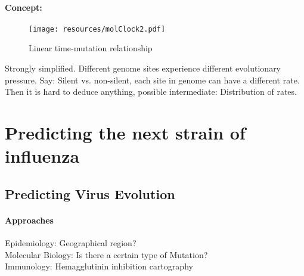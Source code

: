 \documentclass{beamer}
\begin{document}
\begin{darkframes}
    \begin{frame}{\secname}
      \framesubtitle{Concept: \subsecname}
      \begin{figure}
        \texttt{[image: resources/molClock2.pdf]}
        \caption{\footnotesize Linear time-mutation relationship}
      \end{figure}
      \vspace*{-.2cm}
      \footnotesize
      Strongly simplified. Different genome sites experience different evolutionary pressure. Say: Silent vs. non-silent, each site in genome can have a different rate. Then it is hard to deduce anything, possible intermediate: Distribution of rates.
    \end{frame}





  \section{Predicting the next strain of influenza}



    \subsection{Predicting Virus Evolution}

    \begin{frame}{\secname}
      \framesubtitle{Approaches}


      \vfill
      Epidemiology: Geographical region?\\[2mm]

      Molecular Biology: Is there a certain type of Mutation?\\[2mm]

      Immunology: Hemagglutinin inhibition cartography\\[2mm]


\end{frame}
\end{darkframes}
\end{document}
